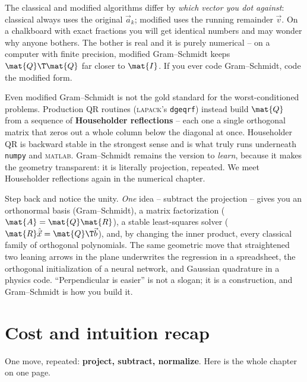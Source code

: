 \begin{trapbox}
The classical and modified algorithms differ by \emph{which vector you dot against}:
classical always uses the original $\vec{a}_k$; modified uses the running remainder
$\vec{v}$. On a chalkboard with exact fractions you will get identical numbers and may
wonder why anyone bothers. The bother is real and it is purely numerical -- on a
computer with finite precision, modified Gram--Schmidt keeps $\mat{Q}\T\mat{Q}$ far
closer to $\mat{I}$. If you ever code Gram--Schmidt, code the modified form.
\end{trapbox}

\begin{remark}
Even modified Gram--Schmidt is not the gold standard for the worst-conditioned
problems. Production QR routines (\textsc{lapack}'s \texttt{dgeqrf}) instead build
$\mat{Q}$ from a sequence of \textbf{Householder reflections} -- each one a single
orthogonal matrix that zeros out a whole column below the diagonal at once. Householder
QR is backward stable in the strongest sense and is what truly runs underneath
\texttt{numpy} and \textsc{matlab}. Gram--Schmidt remains the version to \emph{learn},
because it makes the geometry transparent: it is literally projection, repeated. We
meet Householder reflections again in the numerical chapter.
\end{remark}

\begin{aestheticbox}
Step back and notice the unity. \emph{One} idea -- subtract the projection -- gives you
an orthonormal basis (Gram--Schmidt), a matrix factorization ($\mat{A}=\mat{Q}\mat{R}$),
a stable least-squares solver ($\mat{R}\hat{\vec{x}}=\mat{Q}\T\vec{b}$), and, by
changing the inner product, every classical family of orthogonal polynomials. The same
geometric move that straightened two leaning arrows in the plane underwrites the
regression in a spreadsheet, the orthogonal initialization of a neural network, and
Gaussian quadrature in a physics code. ``Perpendicular is easier'' is not a slogan; it
is a construction, and Gram--Schmidt is how you build it.
\end{aestheticbox}

\section{Cost and intuition recap}

One move, repeated: \textbf{project, subtract, normalize}. Here is the whole chapter on
one page.

